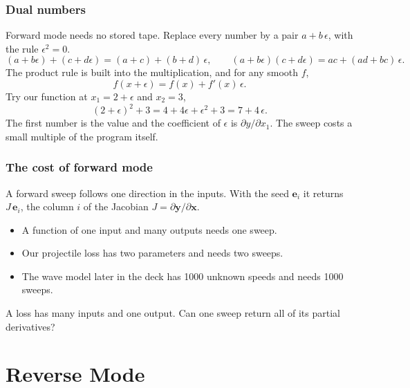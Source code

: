 \documentclass{beamer}
\begin{document}
\begin{frame}
\frametitle{Dual numbers}
Forward mode needs no stored tape.
Replace every number by a pair $a+b\,\epsilon$, with the rule $\epsilon^2=0$.
\[
(a+b\epsilon)+(c+d\epsilon)=(a+c)+(b+d)\,\epsilon,
\qquad
(a+b\epsilon)(c+d\epsilon)=ac+(ad+bc)\,\epsilon .
\]
The product rule is built into the multiplication, and for any smooth $f$,
\[
f(x+\epsilon)=f(x)+f'(x)\,\epsilon .
\]
Try our function at $x_1=2+\epsilon$ and $x_2=3$,
\[
(2+\epsilon)^2+3=4+4\epsilon+\epsilon^2+3=7+4\,\epsilon .
\]
The first number is the value and the coefficient of $\epsilon$ is $\partial y/\partial x_1$.
The sweep costs a small multiple of the program itself.
\end{frame}

\begin{frame}
\frametitle{The cost of forward mode}
A forward sweep follows one direction in the inputs.
With the seed $\mathbf e_i$ it returns $J\,\mathbf e_i$, the column $i$ of the Jacobian $J=\partial\mathbf y/\partial\mathbf x$.
\bigskip

\begin{itemize}
\item A function of one input and many outputs needs one sweep.
\item Our projectile loss has two parameters and needs two sweeps.
\item The wave model later in the deck has 1000 unknown speeds and needs 1000 sweeps.
\end{itemize}
\bigskip

A loss has many inputs and one output.
Can one sweep return all of its partial derivatives?
\end{frame}

\section{Reverse Mode}
\end{document}
